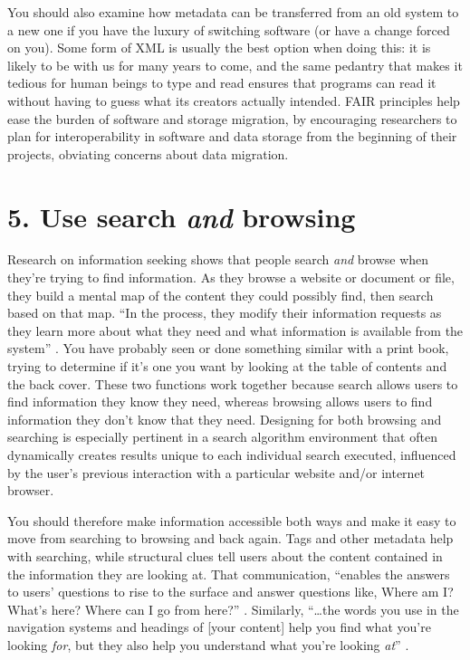 \documentclass[10pt,letterpaper]{article}
\newcommand{\rulemajor}[1]{\section*{#1}}
\begin{document}
You should also examine how metadata can be transferred from an old system to a
new one if you have the luxury of switching software (or have a change forced on
you). Some form of XML is usually the best option when doing this: it is likely
to be with us for many years to come, and the same pedantry that makes it
tedious for human beings to type and read ensures that programs can read it
without having to guess what its creators actually intended. FAIR principles
help ease the burden of software and storage migration, by encouraging
researchers to plan for interoperability in software and data storage from the
beginning of their projects, obviating concerns about data migration.

\rulemajor{5. Use search \emph{and} browsing}

Research on information seeking shows that people search \emph{and} browse when
they're trying to find information. As they browse a website or document or
file, they build a mental map of the content they could possibly find, then
search based on that map. ``In the process, they modify their information
requests as they learn more about what they need and what information is
available from the system'' \cite{Rosenfeld2015}. You have probably seen or
done something similar with a print book, trying to determine if it's one you
want by looking at the table of contents and the back cover. These two
functions work together because search allows users to find information they
know they need, whereas browsing allows users to find information they don't
know that they need\cite{Bates2002}. Designing for both browsing and searching
is especially pertinent in a search algorithm environment that often dynamically
creates results unique to each individual search executed, influenced by the
user's previous interaction with a particular website and/or internet browser.

You should therefore make information accessible both ways and make it easy to
move from searching to browsing and back again. Tags and other metadata help
with searching, while structural clues tell users about the content contained in
the information they are looking at. That communication, ``enables the answers
to users' questions to rise to the surface and answer questions like, Where am
I? What's here? Where can I go from here?''  \cite{Rosenfeld2015}. Similarly,
``{\ldots}the words you use in the navigation systems and headings of [your
  content] help you find what you're looking \emph{for}, but they also help you
understand what you're looking \emph{at}'' \cite{Arango2018}.
\end{document}
